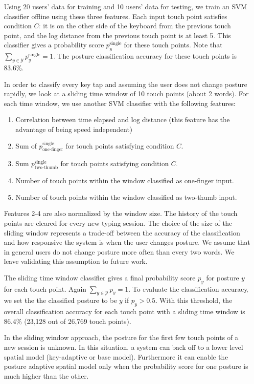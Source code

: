 \documentclass{sigchi}
\begin{document}
Using 20 users’ data for training and 10 users’ data for testing, we train an SVM classifier offline using these three features.  Each input touch point satisfies condition $C$: it is 
on the other side of the keyboard from the previous touch point, and the log distance from the previous touch point is at least 5. This classifier gives a probability score $p_y^{\text{single}}$ for these touch points. Note that $\displaystyle\sum_{y \in \mathcal{Y}}p_y^{\text{single}} = 1$. The posture classification accuracy for these touch points is 83.6\%.
 
In order to classify every key tap and assuming the user does not change posture 
rapidly, we look at a sliding time window of 10 touch points (about 2 words). For 
each time window, we use another SVM classifier with the following features:
\begin{enumerate}
\item Correlation between time elapsed and log distance (this feature has the
advantage of being speed independent)
\item Sum of $p_\text{one-finger}^{\text{single}}$ for touch points satisfying condition $C$.
\item Sum $p_\text{two-thumb}^{\text{single}}$ for touch points satisfying condition $C$.
\item Number of touch points within the window classified as one-finger input.
\item Number of touch points within the window classified as two-thumb input.
\end{enumerate}
Features 2-4 are also normalized by the window size. The history of the touch points are cleared for every new typing session.
The choice of the size of the sliding window represents a trade-off between the 
accuracy of the classification and how responsive the system is when the user
changes posture. We assume that in general users do not change posture
more often than every two words.  We leave validating this assumption to future work.

The sliding time window classifier gives a final probability score $p_y$ for posture
$y$ for each touch point. Again $\displaystyle\sum_{y\in \mathcal{Y}}p_y = 1$. To evaluate the classification accuracy, we set the the
classified posture to be $y$ if $p_y > 0.5$. With this threshold, the overall classification 
accuracy for each touch point with a sliding time window
is 86.4\% (23,128 out of 26,769 touch points).

In the sliding window approach, the posture for the first few touch points  
of a new session is unknown. In this situation, a system can back off to a lower level spatial 
model (key-adaptive or base model). Furthermore it can enable the posture 
adaptive spatial model only when the probability score for one posture is much 
higher than the other.
\end{document}

